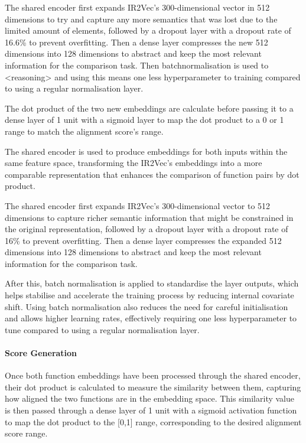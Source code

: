 The shared encoder first expands IR2Vec's 300-dimensional vector in 512 dimensions to try and capture any more semantics that was lost due to the limited amount of elements, followed by a dropout layer with a dropout rate of 16.6\% to prevent overfitting. Then a dense layer compresses the new 512 dimensions into 128 dimensions to abstract and keep the most relevant information for the comparison task.  Then batchnormalisation is used to <reasoning> and using this means one less hyperparameter to training compared to using a regular normalisation layer.

The dot product of the two new embeddings are calculate before passing it to a dense layer of 1 unit with a sigmoid layer to map the dot product to a 0 or 1 range to match the alignment score's range.

The shared encoder is used to produce embeddings for both inputs within the same feature space, transforming the IR2Vec's embeddings into a more comparable representation that enhances the comparison of function pairs by dot product.

The shared encoder first expands IR2Vec's 300-dimensional vector to 512 dimensions to capture richer semantic information that might be constrained in the original representation, followed by a dropout layer with a dropout rate of 16\% to prevent overfitting. Then a dense layer compresses the expanded 512 dimensions into 128 dimensions to abstract and keep the most relevant information for the comparison task. 

After this, batch normalisation is applied to standardise the layer outputs, which helps stabilise and accelerate the training process by reducing internal covariate shift. Using batch normalisation also reduces the need for careful initialisation and allows higher learning rates, effectively requiring one less hyperparameter to tune compared to using a regular normalisation layer.

\paragraph{Score Generation}
Once both function embeddings have been processed through the shared encoder, their dot product is calculated to measure the similarity between them, capturing how aligned the two functions are in the embedding space. This similarity value is then passed through a dense layer of 1 unit with a sigmoid activation function to map the dot product to the [0,1] range, corresponding to the desired alignment score range.

